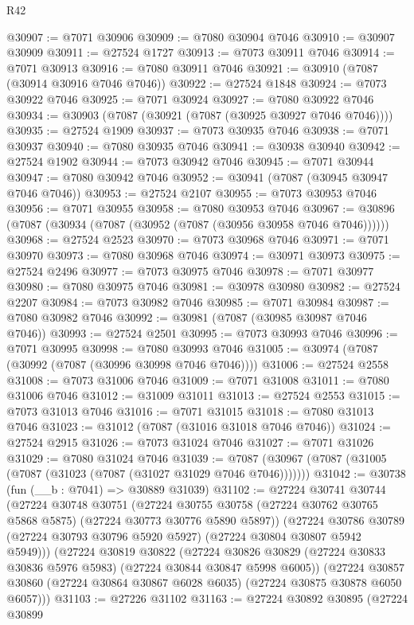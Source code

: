 \begin{lexlean}{R42}
\begin{coremodule}
{@30907 := @7071 @30906
@30909 := @7080 @30904 @7046
@30910 := @30907 @30909
@30911 := @27524 @1727
@30913 := @7073 @30911 @7046
@30914 := @7071 @30913
@30916 := @7080 @30911 @7046
@30921 := @30910 (@7087 (@30914 @30916 @7046 @7046))
@30922 := @27524 @1848
@30924 := @7073 @30922 @7046
@30925 := @7071 @30924
@30927 := @7080 @30922 @7046
@30934 := @30903 (@7087 (@30921 (@7087 (@30925 @30927 @7046 @7046))))
@30935 := @27524 @1909
@30937 := @7073 @30935 @7046
@30938 := @7071 @30937
@30940 := @7080 @30935 @7046
@30941 := @30938 @30940
@30942 := @27524 @1902
@30944 := @7073 @30942 @7046
@30945 := @7071 @30944
@30947 := @7080 @30942 @7046
@30952 := @30941 (@7087 (@30945 @30947 @7046 @7046))
@30953 := @27524 @2107
@30955 := @7073 @30953 @7046
@30956 := @7071 @30955
@30958 := @7080 @30953 @7046
@30967 := @30896 (@7087 (@30934 (@7087 (@30952 (@7087 (@30956 @30958 @7046 @7046))))))
@30968 := @27524 @2523
@30970 := @7073 @30968 @7046
@30971 := @7071 @30970
@30973 := @7080 @30968 @7046
@30974 := @30971 @30973
@30975 := @27524 @2496
@30977 := @7073 @30975 @7046
@30978 := @7071 @30977
@30980 := @7080 @30975 @7046
@30981 := @30978 @30980
@30982 := @27524 @2207
@30984 := @7073 @30982 @7046
@30985 := @7071 @30984
@30987 := @7080 @30982 @7046
@30992 := @30981 (@7087 (@30985 @30987 @7046 @7046))
@30993 := @27524 @2501
@30995 := @7073 @30993 @7046
@30996 := @7071 @30995
@30998 := @7080 @30993 @7046
@31005 := @30974 (@7087 (@30992 (@7087 (@30996 @30998 @7046 @7046))))
@31006 := @27524 @2558
@31008 := @7073 @31006 @7046
@31009 := @7071 @31008
@31011 := @7080 @31006 @7046
@31012 := @31009 @31011
@31013 := @27524 @2553
@31015 := @7073 @31013 @7046
@31016 := @7071 @31015
@31018 := @7080 @31013 @7046
@31023 := @31012 (@7087 (@31016 @31018 @7046 @7046))
@31024 := @27524 @2915
@31026 := @7073 @31024 @7046
@31027 := @7071 @31026
@31029 := @7080 @31024 @7046
@31039 := @7087 (@30967 (@7087 (@31005 (@7087 (@31023 (@7087 (@31027 @31029 @7046 @7046)))))))
@31042 := @30738 (fun (__b : @7041) => @30889 @31039)
@31102 := @27224
    @30741
    @30744
    (@27224
      @30748
      @30751
      (@27224 @30755 @30758 (@27224 @30762 @30765 @5868 @5875) (@27224 @30773 @30776 @5890 @5897))
      (@27224 @30786 @30789 (@27224 @30793 @30796 @5920 @5927) (@27224 @30804 @30807 @5942 @5949)))
    (@27224
      @30819
      @30822
      (@27224 @30826 @30829 (@27224 @30833 @30836 @5976 @5983) (@27224 @30844 @30847 @5998 @6005))
      (@27224 @30857 @30860 (@27224 @30864 @30867 @6028 @6035) (@27224 @30875 @30878 @6050 @6057)))
@31103 := @27226 @31102
@31163 := @27224
    @30892
    @30895
    (@27224
      @30899
}
\end{coremodule}
\end{lexlean}
